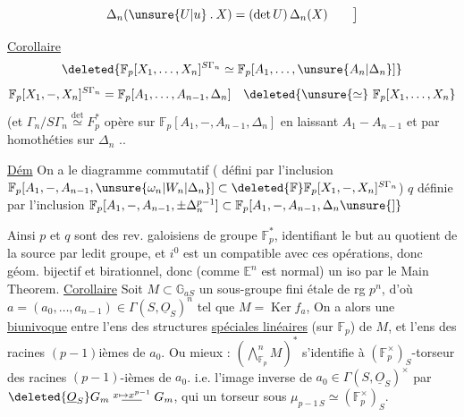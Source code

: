 \[
 \Delta_n(\unsure{U|u}\mathbin{.}X)=(\det U)\,\Delta_n(X)\qquad\big]
\]


\uline{Corollaire}\quad
\[
 \deleted{\mathbb F_p[X_1,\ldots,X_n]^{S\Gamma_n}\simeq
 \mathbb F_p[A_1,\ldots,\unsure{A_n|\Delta_n}]}
\]
\[
 \mathbb F_p[X_1,-,X_n]^{S\Gamma_n}
 =\mathbb F_p[A_1,\ldots,A_{n-1},\Delta_n]\quad
 \deleted{\unsure{\simeq}\ \mathbb F_p[X_1,\ldots,X_n}
\]
(et $\Gamma_n/S\Gamma_n\overset{\det}{\simeq} F_p^*$ opère sur
$\mathbb F_p[A_1,-,A_{n-1},\Delta_n]$ en laissant $A_1-A_{n-1}$ et par homothéties sur $\Delta_n$ ..

\uline{Dém} On a le diagramme commutatif
( défini par l'inclusion
$\mathbb F_p[A_1,-,A_{n-1},\unsure{\omega_n|W_n|\Delta_n}]\subset
\deleted{\mathbb F}\mathbb F_p[X_1,-,X_n]^{S\Gamma_n}$)
$q$ définie par l'inclusion
$\mathbb F_p[A_1,-,A_{n-1},\pm\Delta_n^{p-1}]\subset
\mathbb F_p[A_1,-,A_{n-1},\Delta_n\unsure{]}$

Ainsi $p$ et $q$ sont des rev. galoisiens de groupe $\mathbb F_p^*$, identifiant le but au quotient de la source par ledit groupe, et $i^0$ est un  compatible avec ces opérations, donc géom. bijectif et birationnel, donc (comme $\mathbb E^n$ est normal) un iso par le Main Theorem.
\uline{Corollaire} Soit $M\subset\mathbb G_{aS}$ un sous-groupe fini étale
 de rg $p^n$, d'où
$a=(a_0,\ldots,a_{n-1})\in\Gamma(S,\underline O_S)^n$ tel que
$M=\operatorname{Ker} f_a$, 
On a alors une \uline{ biunivoque} entre l'ens des structures
\uline{spéciales linéaires} (sur $\mathbb F_p$) de $M$, et l'ens des racines
$(p-1)$ièmes de $a_0$.
Ou mieux : $(\bigwedge_{\mathbb F_p}^{n} M)^*$ s'identifie à
$(\mathbb F_p^{\times})_S$-torseur des racines $(p-1)$-ièmes de $a_0$.
i.e.   l'image inverse de
$a_0\in\Gamma(S,\underline O_S)^\times$ par
$\deleted{\underline O_S}G_m\mathrel{\overset{x\mapsto x^{p-1}}{\rule{1.6em}{.4pt}}}G_m$,
qui  un torseur sous $\mu_{p-1\, S}\simeq(\mathbb F_p^\times)_S$.

